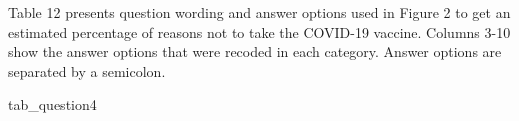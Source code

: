 \documentclass[
  12pt,
]{article}
\newenvironment{Shaded}{\begin{snugshade}}{\end{snugshade}}
\newcommand{\NormalTok}[1]{#1}
\begin{document}
\begin{landscape}
\begin{table}[!h]
{\begin{threeparttable}
\begin{tabular}[t]
\bottomrule
\end{tabular}
\begin{tablenotes}
\item Table 12 presents question wording and answer options used in Figure 2 to get an estimated percentage of reasons not to take the COVID-19 vaccine. Columns 3-10 show the answer options that were recoded in each category. Answer options are separated by a semicolon.
\end{tablenotes}
\end{threeparttable}}
\end{table}
\end{landscape}

\begin{Shaded}
\begin{Highlighting}[]
\NormalTok{tab\_question4}
\end{Highlighting}
\end{Shaded}
\end{document}
